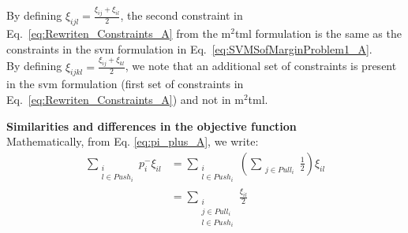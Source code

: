 \noindent By defining $\xi_{ijl}=\frac{\xi_{ij}+\xi_{il}}{2}$, the second constraint in Eq.~\ref{eq:Rewriten_Constraints_A} from the {\sc m$^2$tml} formulation is the same as the constraints in the {\sc svm} formulation in Eq.~\ref{eq:SVMSofMarginProblem1_A}. \\
\noindent By defining $\xi_{ijkl}=\frac{\xi_{ij}+\xi_{kl}}{2}$, we note that an additional set of constraints is present in the {\sc svm} formulation (first set of constraints in Eq.~\ref{eq:Rewriten_Constraints_A}) and not in {\sc m$^2$tml}. 



\noindent \textbf{Similarities and differences in the objective function} \\
\noindent Mathematically, from Eq. \ref{eq:pi_plus_A}, we write:
\begin{align}
	\sum\limits_{\substack{i \\ l \in Push_i}}p_i^-\xi_{il} 
	& = 
	\sum_{\substack{i \\ l \in Push_i}} \left( \sum_{\substack{j \in Pull_i}} \frac{1}{2}\right) \xi_{il}\\
	& =
	\sum_{\substack{i \\ j \in Pull_i \\ l \in Push_i}} \frac{\xi_{il}}{2} \label{eq:pi_plus2}
\end{align}

